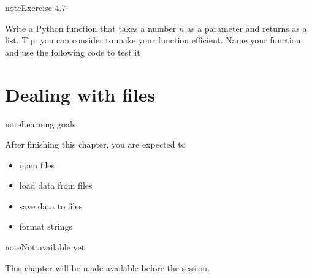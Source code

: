 \documentclass[letterpaper,10pt,english]{jupyterBook}
\begin{document}
\begin{sphinxadmonition}{note}{Exercise 4.7}

\sphinxAtStartPar
Write a Python function that takes a number \(n\) as a parameter and returns  as a list. Tip: you can consider  to make your function efficient. Name your function  and use the following code to test it

\begin{sphinxVerbatim}[commandchars=\\\{\}]
 

  
  
\end{sphinxVerbatim}
\end{sphinxadmonition}

\sphinxstepscope


\chapter{Dealing with files}
\label{\detokenize{placeholder_notebooks/4_Files/4_Files_student:dealing-with-files}}\label{\detokenize{placeholder_notebooks/4_Files/4_Files_student::doc}}
\begin{sphinxadmonition}{note}{Learning goals}

\sphinxAtStartPar
After finishing this chapter, you are expected to
\begin{itemize}
\item {} 
\sphinxAtStartPar
open files

\item {} 
\sphinxAtStartPar
load data from files

\item {} 
\sphinxAtStartPar
save data to files

\item {} 
\sphinxAtStartPar
format strings

\end{itemize}
\end{sphinxadmonition}

\begin{sphinxadmonition}{note}{Not available yet}

\sphinxAtStartPar
This chapter will be made available before the session.
\end{sphinxadmonition}
\end{document}
